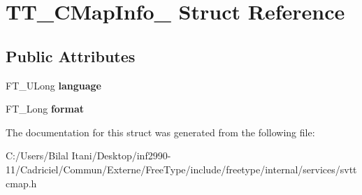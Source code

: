 \hypertarget{struct_t_t___c_map_info__}{}\section{T\+T\+\_\+\+C\+Map\+Info\+\_\+ Struct Reference}
\label{struct_t_t___c_map_info__}
\subsection*{Public Attributes}
\begin{DoxyCompactItemize}
\item 
F\+T\+\_\+\+U\+Long {\bfseries language}\hypertarget{struct_t_t___c_map_info___a4096f460af57f87cb9434a411c502d86}{}\label{struct_t_t___c_map_info___a4096f460af57f87cb9434a411c502d86}

\item 
F\+T\+\_\+\+Long {\bfseries format}\hypertarget{struct_t_t___c_map_info___a122d56b4755597f134fcf4865cb0a4fc}{}\label{struct_t_t___c_map_info___a122d56b4755597f134fcf4865cb0a4fc}

\end{DoxyCompactItemize}


The documentation for this struct was generated from the following file\+:\begin{DoxyCompactItemize}
\item 
C\+:/\+Users/\+Bilal Itani/\+Desktop/inf2990-\/11/\+Cadriciel/\+Commun/\+Externe/\+Free\+Type/include/freetype/internal/services/svttcmap.\+h\end{DoxyCompactItemize}
